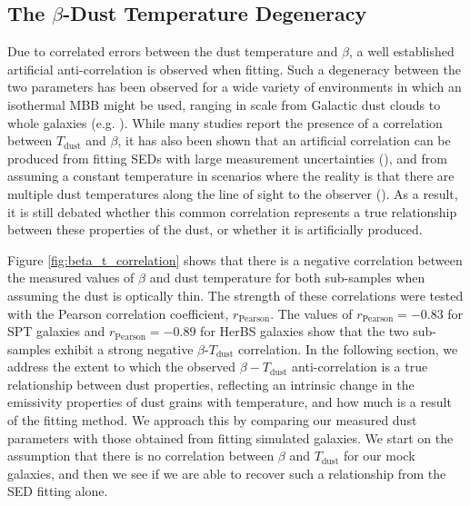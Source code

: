 \subsection{The $\beta$-Dust Temperature Degeneracy}

Due to correlated errors between the dust temperature and $\beta$, a well established artificial anti-correlation is observed when fitting. Such a degeneracy between the two parameters has been observed for a wide variety of environments in which an isothermal MBB might be used, ranging in scale from Galactic dust clouds to whole galaxies (e.g. \citealt{Dupac_2003, Desert_2008, Paradis_2010, Schnee_2010, Veneziani_2010, Bracco_2011, Galametz_2012, Paladini_2012, Smith_2012, Lamperti_2019, daCunha_2021}). While many studies report the presence of a correlation between $T_\textrm{dust}$ and $\beta$, it has also been shown that an artificial correlation can be produced from fitting SEDs with large measurement uncertainties (\citealt{Shetty_2009a, Kelly_2012, Juvela_2012a}), and from assuming a constant temperature in scenarios where the reality is that there are multiple dust temperatures along the line of sight to the observer (\citealt{Shetty_2009b, Juvela_2012b}). As a result, it is still debated whether this common correlation represents a true relationship between these properties of the dust, or whether it is artificially produced.

Figure \ref{fig:beta_t_correlation} shows that there is a negative correlation between the measured values of $\beta$ and dust temperature for both sub-samples when assuming the dust is optically thin. The strength of these correlations were tested with the Pearson correlation coefficient, $r_{\textrm{Pearson}}$. The values of $r_{\textrm{Pearson}} = -0.83$ for SPT galaxies and $r_{\textrm{Pearson}} = -0.89$ for HerBS galaxies show that the two sub-samples exhibit a strong negative $\beta$-$T_{\textrm{dust}}$ correlation. In the following section, we address the extent to which the observed $\beta-T_{\textrm{dust}}$ anti-correlation is a true relationship between dust properties, reflecting an intrinsic change in the emissivity properties of dust grains with temperature, and how much is a result of the fitting method. We approach this by comparing our measured dust parameters with those obtained from fitting simulated galaxies. We start on the assumption that there is no correlation between $\beta$ and $T_{\textrm{dust}}$ for our mock galaxies, and then we see if we are able to recover such a relationship from the SED fitting alone.

